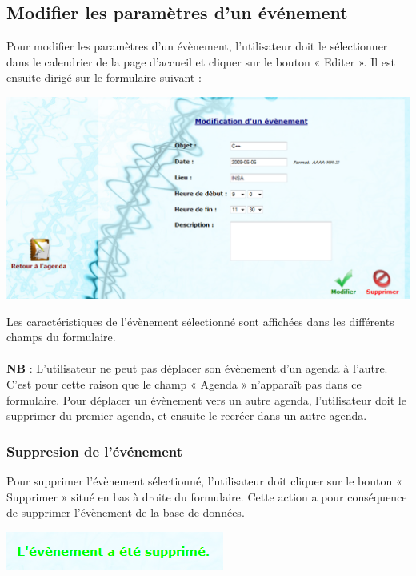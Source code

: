 \documentclass[12pt , a4paper]{article}
\begin{document}
\subsection{Modifier les paramètres d'un événement}
\noindent Pour modifier les paramètres d’un évènement, l’utilisateur doit le sélectionner dans le
calendrier de la page d’accueil et cliquer sur le bouton « Editer ». Il est ensuite dirigé sur le
formulaire suivant :
\begin{center}
  \includegraphics[scale=0.6]{./images/modif_event.png}
\end{center}




\noindent Les caractéristiques de l’évènement sélectionné sont affichées dans les différents champs du
formulaire.\\ \\
\textbf{NB} : L’utilisateur ne peut pas déplacer son évènement d’un agenda à l’autre. C’est pour cette
raison que le champ « Agenda » n’apparaît pas dans ce formulaire. Pour déplacer un
évènement vers un autre agenda, l’utilisateur doit le supprimer du premier agenda, et ensuite
le recréer dans un autre agenda.

\subsubsection{Suppresion de l'événement}
\noindent Pour supprimer l’évènement sélectionné, l’utilisateur doit cliquer sur le bouton « Supprimer »
situé en bas à droite du formulaire. Cette action a pour conséquence de supprimer
l’évènement de la base de données.
\begin{center}
  \includegraphics[scale=0.6]{./images/modif_event3.png}
\end{center}
\end{document}
